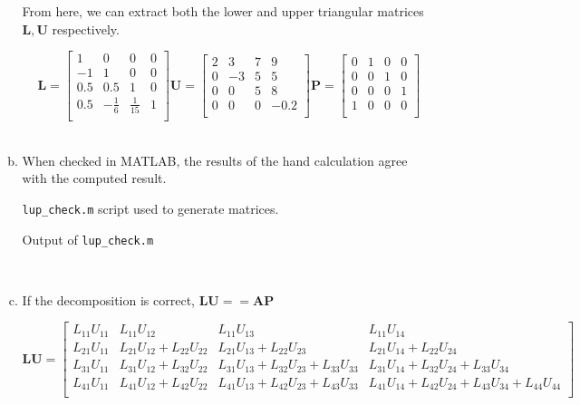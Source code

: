 \documentclass[11pt]{article}
\begin{document}
\begin{enumerate}
\begin{enumerate}[(a)]
				From here, we can extract both the lower and upper triangular matrices $\mathbf{L, U}$ respectively.

				\[
					\mathbf{L}=
					\begin{bmatrix}
						1 & 0 & 0 & 0 \\
						-1 & 1 & 0 & 0 \\
						0.5 & 0.5 & 1 & 0 \\
						0.5 & -\frac{1}{6} & \frac{1}{15} & 1 \\
					\end{bmatrix}
					\mathbf{U}=
					\begin{bmatrix}
						2 & 3 & 7 & 9 \\
						0 & -3 & 5 & 5 \\
						0 & 0 & 5 & 8 \\
						0 & 0 & 0 & -0.2 \\
					\end{bmatrix}
					\mathbf{P}=
					\begin{bmatrix}
						0 & 1 & 0 & 0 \\
						0 & 0 & 1 & 0 \\
						0 & 0 & 0 & 1 \\
						1 & 0 & 0 & 0 \\
					\end{bmatrix}
				\] \\

			\item When checked in MATLAB, the results of the hand calculation agree with the computed result.

				\begin{center}
					\texttt{lup\_check.m} script used to generate matrices.
				\end{center}
				

				\begin{center}
					Output of \texttt{lup\_check.m}
				\end{center}
				 \

			\item If the decomposition is correct, $\mathbf{LU == AP}$

				\[
					\mathbf{LU}=
					\begin{bmatrix}
						L_{11}U_{11} & L_{11}U_{12} & L_{11}U_{13} & L_{11}U_{14} \\
						L_{21}U_{11} & L_{21}U_{12} + L_{22}U_{22} & L_{21}U_{13} + L_{22}U_{23} &
						L_{21}U_{14} + L_{22}U_{24} \\
						L_{31}U_{11} & L_{31}U_{12} + L_{32}U_{22} & L_{31}U_{13} + L_{32}U_{23} + L_{33}U_{33} &
						L_{31}U_{14} + L_{32}U_{24} + L_{33}U_{34} \\
						L_{41}U_{11} & L_{41}U_{12} + L_{42}U_{22} & L_{41}U_{13} + L_{42}U_{23} + L_{43}U_{33} &
						L_{41}U_{14} + L_{42}U_{24} + L_{43}U_{34} + L_{44}U_{44} \\
					\end{bmatrix}
				\]


\end{enumerate}
\end{enumerate}
\end{document}
